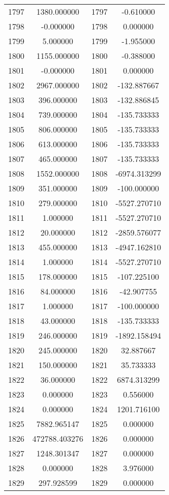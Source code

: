 \documentclass[12pt]{article}
\begin{document}
\begin{longtable}{@{}cccc@{}}
1797 & 1380.000000 & 1797 & -0.610000 \\
1798 & -0.000000 & 1798 & 0.000000 \\
1799 & 5.000000 & 1799 & -1.955000 \\
1800 & 1155.000000 & 1800 & -0.388000 \\
1801 & -0.000000 & 1801 & 0.000000 \\
1802 & 2967.000000 & 1802 & -132.887667 \\
1803 & 396.000000 & 1803 & -132.886845 \\
1804 & 739.000000 & 1804 & -135.733333 \\
1805 & 806.000000 & 1805 & -135.733333 \\
1806 & 613.000000 & 1806 & -135.733333 \\
1807 & 465.000000 & 1807 & -135.733333 \\
1808 & 1552.000000 & 1808 & -6974.313299 \\
1809 & 351.000000 & 1809 & -100.000000 \\
1810 & 279.000000 & 1810 & -5527.270710 \\
1811 & 1.000000 & 1811 & -5527.270710 \\
1812 & 20.000000 & 1812 & -2859.576077 \\
1813 & 455.000000 & 1813 & -4947.162810 \\
1814 & 1.000000 & 1814 & -5527.270710 \\
1815 & 178.000000 & 1815 & -107.225100 \\
1816 & 84.000000 & 1816 & -42.907755 \\
1817 & 1.000000 & 1817 & -100.000000 \\
1818 & 43.000000 & 1818 & -135.733333 \\
1819 & 246.000000 & 1819 & -1892.158494 \\
1820 & 245.000000 & 1820 & 32.887667 \\
1821 & 150.000000 & 1821 & 35.733333 \\
1822 & 36.000000 & 1822 & 6874.313299 \\
1823 & 0.000000 & 1823 & 0.556000 \\
1824 & 0.000000 & 1824 & 1201.716100 \\
1825 & 7882.965147 & 1825 & 0.000000 \\
1826 & 472788.403276 & 1826 & 0.000000 \\
1827 & 1248.301347 & 1827 & 0.000000 \\
1828 & 0.000000 & 1828 & 3.976000 \\
1829 & 297.928599 & 1829 & 0.000000 \\

\end{longtable}
\end{document}
